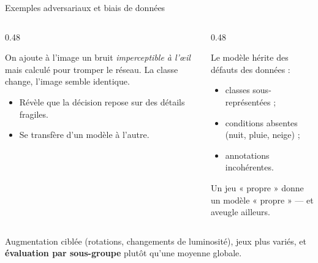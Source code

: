\begin{frame}{Exemples adversariaux et biais de données}
\begin{columns}[t]
\begin{column}{0.48\textwidth}
\begin{wbox}
On ajoute à l'image un bruit \emph{imperceptible à l'œil} mais calculé pour
tromper le réseau. La classe change, l'image semble identique.
\begin{itemize}
  \item Révèle que la décision repose sur des détails fragiles.
  \item Se transfère d'un modèle à l'autre.
\end{itemize}
\end{wbox}
\end{column}
\begin{column}{0.48\textwidth}
\begin{kbox}
Le modèle hérite des défauts des données :
\begin{itemize}
  \item classes sous-représentées ;
  \item conditions absentes (nuit, pluie, neige) ;
  \item annotations incohérentes.
\end{itemize}
Un jeu « propre » donne un modèle « propre » --- et aveugle ailleurs.
\end{kbox}
\end{column}
\end{columns}
\vspace{1mm}
\begin{ebox}
Augmentation ciblée (rotations, changements de luminosité), jeux plus variés,
et \textbf{évaluation par sous-groupe} plutôt qu'une moyenne globale.
\end{ebox}
\end{frame}

